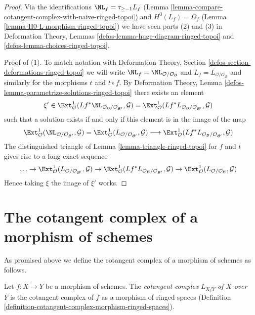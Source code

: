 \begin{proof}
Via the identifications $\NL_f = \tau_{\geq -1}L_f$
(Lemma \ref{lemma-compare-cotangent-complex-with-naive-ringed-topoi}) and
$H^0(L_f) = \Omega_f$
(Lemma \ref{lemma-H0-L-morphism-ringed-topoi})
we have seen parts (2) and (3) in
Deformation Theory, Lemmas \ref{defos-lemma-huge-diagram-ringed-topoi} and
\ref{defos-lemma-choices-ringed-topoi}.

\medskip\noindent
Proof of (1). To match notation with Deformation Theory, Section
\ref{defos-section-deformations-ringed-topoi} we will write
$\NL_f = \NL_{\mathcal{O}/\mathcal{O}_\mathcal{B}}$ and
$L_f = L_{\mathcal{O}/\mathcal{O}_\mathcal{B}}$ and similarly
for the morphisms $t$ and $t \circ f$. By
Deformation Theory, Lemma \ref{defos-lemma-parametrize-solutions-ringed-topoi}
there exists an element
$$
\xi' \in
\Ext^1_\mathcal{O}(
Lf^*\NL_{\mathcal{O}_\mathcal{B}/\mathcal{O}_{\mathcal{B}'}}, \mathcal{G}) =
\Ext^1_\mathcal{O}(
Lf^*L_{\mathcal{O}_\mathcal{B}/\mathcal{O}_{\mathcal{B}'}}, \mathcal{G})
$$
such that a solution exists if and only if this element is in
the image of the map
$$
\Ext^1_\mathcal{O}(
\NL_{\mathcal{O}/\mathcal{O}_{\mathcal{B}'}}, \mathcal{G}) =
\Ext^1_\mathcal{O}(
L_{\mathcal{O}/\mathcal{O}_{\mathcal{B}'}}, \mathcal{G})
\longrightarrow
\Ext^1_\mathcal{O}(
Lf^*L_{\mathcal{O}_\mathcal{B}/\mathcal{O}_{\mathcal{B}'}}, \mathcal{G})
$$
The distinguished triangle of Lemma \ref{lemma-triangle-ringed-topoi}
for $f$ and $t$ gives rise to a long exact sequence
$$
\ldots \to
\Ext^1_\mathcal{O}(
L_{\mathcal{O}/\mathcal{O}_{\mathcal{B}'}}, \mathcal{G}) \to
\Ext^1_\mathcal{O}(
Lf^*L_{\mathcal{O}_\mathcal{B}/\mathcal{O}_{\mathcal{B}'}}, \mathcal{G})
\to
\Ext^1_\mathcal{O}(
L_{\mathcal{O}/\mathcal{O}_\mathcal{B}}, \mathcal{G})
$$
Hence taking $\xi$ the image of $\xi'$ works.
\end{proof}












\section{The cotangent complex of a morphism of schemes}
\label{section-cotangent-morphism-schemes}

\noindent
As promised above we define the cotangent complex of a morphism of
schemes as follows.

\begin{definition}
\label{definition-cotangent-morphism-schemes}
Let $f : X \to Y$ be a morphism of schemes. The {\it cotangent complex
$L_{X/Y}$ of $X$ over $Y$} is the cotangent complex of $f$ as a
morphism of ringed spaces
(Definition \ref{definition-cotangent-complex-morphism-ringed-spaces}).
\end{definition}

